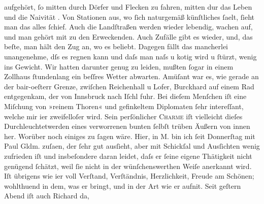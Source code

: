 \begin{ledgroupsized}[t]{13cm}
                    aufgehört, ſo mitten durch Dörfer und Flecken zu fahren, mitten dur das Leben und die Naivität \damage{\textcolor{gray}{eines Ortes}}. Von Stationen aus, wo ſich naturgemäß künſtliches ſa{\geminationm}elt, ſieht man das alles ſchief. Auch die
                    Landſtraßen werden wieder lebendig, wachen auf, und man gehört mit zu den
                    Erweckenden. Auch Zufälle gibt es wieder, und, das beſte, man hält den Zug an,
                    wo es beliebt. {\pb}Dagegen fällt das mancherlei
                    unangenehme, dſs es regnen kann und daſs man naſs u kotig wird u ſtürzt, wenig
                    ins Gewicht. Wir hatten darunter genug zu leiden, mußten ſogar in einem Zollhaus
                    ſtundenlang ein beſſres Wetter abwarten. Amüſant war es, wie gerade an der bair-oeſterr
                    Grenze, zwiſchen Reichenhall u Lofer, Burckhard auf einem Rad entgegenkam, der von Innsbruck nach Iſchl
                    fuhr. Bei dieſem Menſchen iſt eine Miſchung von »reinem Thoren« und gefinkeltem
                    Diplomaten ſehr intereſſant, welche mir i{\geminationm}er
                    zweifelloſer {\pb}wird. Sein perſönlicher \textsc{Charme} iſt vielleicht dieſes Durchleuchtetwerden eines
                    verworrenen bunten ſelbſt trüben Äußern von innen her.\pend
           \pstart
           Worüber noch einiges zu ſagen wäre. Hier, in M. bin ich ſeit Donnerſtag mit Paul Gldm. zuſa{\geminationm}en, der ſehr
                    gut ausſieht, aber mit Schickſal und Ausſichten wenig zufrieden iſt und
                    insbeſondere daran leidet, daſs er ſeine eigene Thätigkeit nicht genügend
                    ſchätzt, weil ſie nicht in der wünſchenswerthen Weiſe anerkannt wird. Iſt
                    übrigens wie i{\geminationm}er voll Verſtand, Verſtändnis,
                    Herzlichkeit, Freude am Schönen; wohlthuend in dem, was er bringt, und in {\pb}der Art wie er aufni{\geminationm}t. Seit geſtern Abend iſt auch Richard da,

\end{ledgroupsized}
